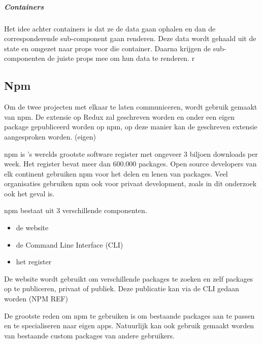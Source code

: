 \subparagraph{Containers}
Het idee achter containers is dat ze de data gaan ophalen en dan de corresponderende sub-component gaan renderen. Deze data wordt gehaald uit de state en omgezet naar props voor die container. Daarna krijgen de sub-componenten de juiste props mee om hun data te renderen. r



\subsection{Npm}
Om de twee projecten met elkaar te laten communiceren, wordt gebruik gemaakt van npm. De extensie op Redux zal geschreven worden en onder een eigen package gepubliceerd worden op npm, op deze manier kan de geschreven extensie aangesproken worden. 
(eigen)


npm is 's werelds grootste software register met ongeveer 3 biljoen downloads per week. Het register bevat meer dan 600.000 packages. Open source developers van elk continent gebruiken npm voor het delen en lenen van packages. Veel organisaties gebruiken npm ook voor privaat development, zoals in dit onderzoek ook het geval is. 

npm bestaat uit 3 verschillende componenten.
\begin{itemize}
	\item de website
	\item de Command Line Interface (CLI)
	\item het register
\end{itemize}

De website wordt gebruikt om verschillende packages te zoeken en zelf packages op te publiceren, privaat of publiek. Deze publicatie kan via de CLI gedaan worden
(NPM REF)

De grootste reden om npm te gebruiken is om bestaande packages aan te passen en te specialiseren naar eigen apps. Natuurlijk kan ook gebruik gemaakt worden van bestaande custom packages van andere gebruikers.
 



